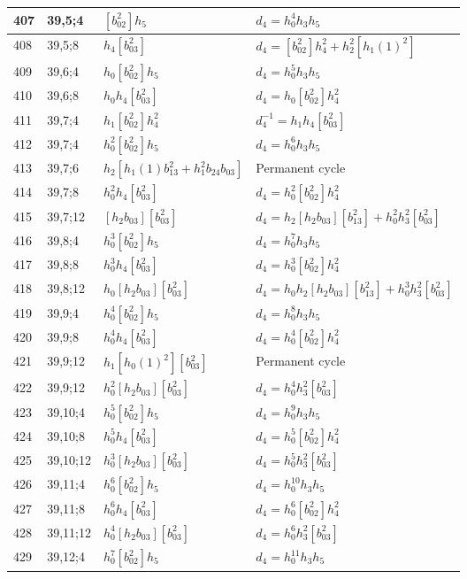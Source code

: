 \documentclass{article}
\begin{document}
\begin{longtable}{|l|l|>{\raggedright\arraybackslash}p{6cm}|>{\raggedright\arraybackslash}p{6cm}|}
407 & 39,5;4 & $[b_{02}^2]h_5$ &$d_{4}=h_0^4h_3h_5$\\
\hline
408 & 39,5;8 & $h_4[b_{03}^2]$ &$d_{4}=[b_{02}^2]h_4^2 + h_2^2[h_1(1)^2]$\\
\hline
409 & 39,6;4 & $h_0[b_{02}^2]h_5$ &$d_{4}=h_0^5h_3h_5$\\
\hline
410 & 39,6;8 & $h_0h_4[b_{03}^2]$ &$d_{4}=h_0[b_{02}^2]h_4^2$\\
\hline
411 & 39,7;4 & $h_1[b_{02}^2]h_4^2$ & $d_{4}^{-1}=h_1h_4[b_{03}^2]$\\
412 & 39,7;4 & $h_0^2[b_{02}^2]h_5$ &$d_{4}=h_0^6h_3h_5$\\
\hline
413 & 39,7;6 & $h_2[h_1(1)b_{13}^2 + h_1^2b_{24}b_{03}]$ & Permanent cycle\\
\hline
414 & 39,7;8 & $h_0^2h_4[b_{03}^2]$ &$d_{4}=h_0^2[b_{02}^2]h_4^2$\\
\hline
415 & 39,7;12 & $[h_2b_{03}][b_{03}^2]$ &$d_{4}=h_2[h_2b_{03}][b_{13}^2] + h_0^2h_3^2[b_{03}^2]$\\
\hline
416 & 39,8;4 & $h_0^3[b_{02}^2]h_5$ &$d_{4}=h_0^7h_3h_5$\\
\hline
417 & 39,8;8 & $h_0^3h_4[b_{03}^2]$ &$d_{4}=h_0^3[b_{02}^2]h_4^2$\\
\hline
418 & 39,8;12 & $h_0[h_2b_{03}][b_{03}^2]$ &$d_{4}=h_0h_2[h_2b_{03}][b_{13}^2] + h_0^3h_3^2[b_{03}^2]$\\
\hline
419 & 39,9;4 & $h_0^4[b_{02}^2]h_5$ &$d_{4}=h_0^8h_3h_5$\\
\hline
420 & 39,9;8 & $h_0^4h_4[b_{03}^2]$ &$d_{4}=h_0^4[b_{02}^2]h_4^2$\\
\hline
421 & 39,9;12 & $h_1[h_0(1)^2][b_{03}^2]$ & Permanent cycle\\
422 & 39,9;12 & $h_0^2[h_2b_{03}][b_{03}^2]$ &$d_{4}=h_0^4h_3^2[b_{03}^2]$\\
\hline
423 & 39,10;4 & $h_0^5[b_{02}^2]h_5$ &$d_{4}=h_0^9h_3h_5$\\
\hline
424 & 39,10;8 & $h_0^5h_4[b_{03}^2]$ &$d_{4}=h_0^5[b_{02}^2]h_4^2$\\
\hline
425 & 39,10;12 & $h_0^3[h_2b_{03}][b_{03}^2]$ &$d_{4}=h_0^5h_3^2[b_{03}^2]$\\
\hline
426 & 39,11;4 & $h_0^6[b_{02}^2]h_5$ &$d_{4}=h_0^{10}h_3h_5$\\
\hline
427 & 39,11;8 & $h_0^6h_4[b_{03}^2]$ &$d_{4}=h_0^6[b_{02}^2]h_4^2$\\
\hline
428 & 39,11;12 & $h_0^4[h_2b_{03}][b_{03}^2]$ &$d_{4}=h_0^6h_3^2[b_{03}^2]$\\
\hline
429 & 39,12;4 & $h_0^7[b_{02}^2]h_5$ &$d_{4}=h_0^{11}h_3h_5$\\

\end{longtable}
\end{document}
